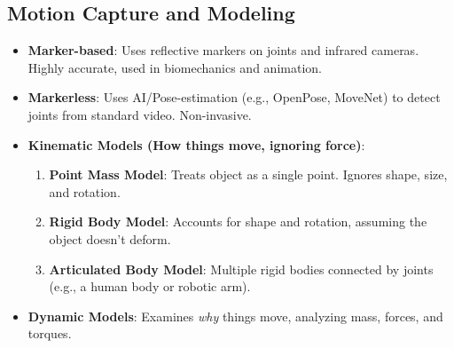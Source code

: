 \documentclass[11pt,a4paper]{article}
\begin{document}
\subsection{Motion Capture and Modeling}
\begin{itemize}
    \item \textbf{Marker-based}: Uses reflective markers on joints and infrared cameras. Highly accurate, used in biomechanics and animation.
    \item \textbf{Markerless}: Uses AI/Pose-estimation (e.g., OpenPose, MoveNet) to detect joints from standard video. Non-invasive.
    \item \textbf{Kinematic Models (How things move, ignoring force)}:
    \begin{enumerate}
        \item \textbf{Point Mass Model}: Treats object as a single point. Ignores shape, size, and rotation.
        \item \textbf{Rigid Body Model}: Accounts for shape and rotation, assuming the object doesn't deform.
        \item \textbf{Articulated Body Model}: Multiple rigid bodies connected by joints (e.g., a human body or robotic arm).
    \end{enumerate}
    \item \textbf{Dynamic Models}: Examines \textit{why} things move, analyzing mass, forces, and torques.
\end{itemize}
\end{document}
